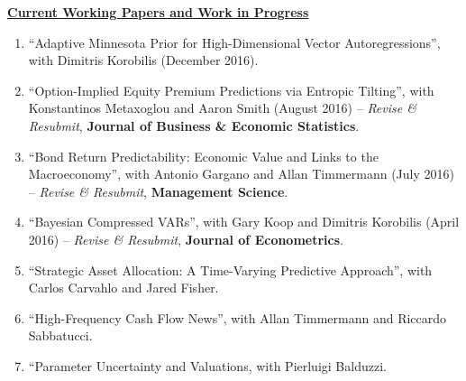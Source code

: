 \documentclass[12pt]{article}
\begin{document}
\underline{\textbf{Current Working Papers and Work in Progress}}
\begin{enumerate}
	\setcounter{enumi}{\theenumTemp}
	\item ``Adaptive Minnesota Prior for High-Dimensional Vector Autoregressions'', with Dimitris Korobilis (December 2016).
	\item ``Option-Implied Equity Premium Predictions via Entropic Tilting'', with Konstantinos Metaxoglou  and Aaron Smith (August 2016) -- \textit{Revise \& Resubmit}, \textbf{Journal of Business \& Economic Statistics}.
	\item ``Bond Return Predictability: Economic Value and Links to the Macroeconomy'', with Antonio Gargano and Allan Timmermann (July 2016) -- \textit{Revise \& Resubmit}, \textbf{Management Science}.
	\item ``Bayesian Compressed VARs'', with Gary Koop and Dimitris Korobilis (April 2016) -- \textit{Revise \& Resubmit}, \textbf{Journal of Econometrics}.
	\item ``Strategic Asset Allocation: A Time-Varying Predictive Approach'', with Carlos Carvahlo and Jared Fisher.
	\item ``High-Frequency Cash Flow News'', with Allan Timmermann and Riccardo Sabbatucci.
	\item ``Parameter Uncertainty and Valuations, with Pierluigi Balduzzi.
	
\end{enumerate}
\end{document}
